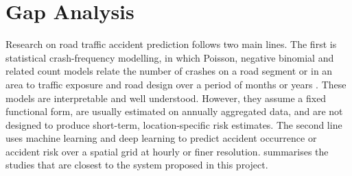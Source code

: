 \section{Gap Analysis}
\label{sec:gap}

Research on road traffic accident prediction follows two main lines. The first is statistical crash-frequency modelling, in which Poisson, negative binomial and related count models relate the number of crashes on a road segment or in an area to traffic exposure and road design over a period of months or years \cite{lord2010statistical,mannering2014analytic}. These models are interpretable and well understood. However, they assume a fixed functional form, are usually estimated on annually aggregated data, and are not designed to produce short-term, location-specific risk estimates. The second line uses machine learning and deep learning to predict accident occurrence or accident risk over a spatial grid at hourly or finer resolution.  summarises the studies that are closest to the system proposed in this project.

